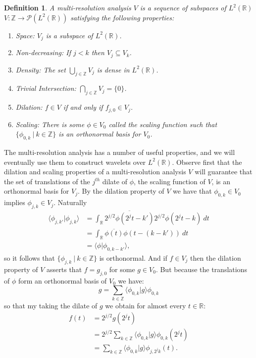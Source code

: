 \documentclass{report}
\newtheorem{def:multiresolutionanalysis}[thm:ellwave]{Definition}
\newcommand{\Z}{\mathbb{Z}}
\newcommand{\R}{\mathbb{R}}
\newcommand{\pow}{\mathcal{P}}
\begin{document}
\begin{def:multiresolutionanalysis}
A \emph{multi-resolution analysis} $V$ is a sequence of subspaces of $L^2 (\R)$ $V: \Z \to \pow (L^2 (\R ))$ satisfying the following properties:
\begin{enumerate}
\item \emph {Space:} $V_j$ is a subspace of $L^2(\R)$.
\item \emph{Non-decreasing:} If $j<k$ then $V_j \subseteq V_k$.
\item \emph{Density:} The set $\bigcup_{j \in \Z} V_j$ is dense in $L^2 (\R)$.
\item \emph{Trivial Intersection:} $\bigcap_{j \in \Z} V_j=\{0\}$.
\item \emph{Dilation:} $f \in V$ if and only if $f_{j,0} \in V_j$.
\item \emph{Scaling:} There is some $\phi \in V_0$ called the \emph{scaling function} such that $\{\phi_{0,k} \ | \ k \in \Z\}$ is an orthonormal basis for $V_0$.
\end{enumerate}
\end{def:multiresolutionanalysis}
The multi-resolution analysis has a number of useful properties, and we will eventually use them to construct wavelets over $L^2 (\R)$.  %
Observe first that the dilation and scaling properties of a multi-resolution analysis $V$ will guarantee that the set of translations of the $j^{th}$ dilate of $\phi$, the scaling function of $V$, is an orthonormal basis for $V_j$.
By the dilation property of $V$ we have that $\phi_{0,k} \in V_0$ implies $\phi_{j,k} \in V_j$. Naturally
\begin{align*}
\langle \phi_{j,k'} | \phi_{j,k} \rangle &= \int_\R \overline{2^{j/2}\phi(2^jt-k')} 2^{j/2}\phi(2^jt-k) \ dt\\
&= \int_\R \overline{\phi(t)}\phi(t-(k-k')) \ dt \\
&=\langle \phi | \phi_{0,k-k'} \rangle  ,
\end{align*}
so it follows that $\{ \phi_{j,k} \ | \ k\in \Z \}$ is orthonormal. And if $f \in V_j$ then the dilation property of $V$ asserts that $f=g_{j,0}$ for some $g \in V_0$. But because the translations of $\phi$ form an orthonormal basis of $V_0$ we have:
$$
g=\sum_{k \in \Z} \langle \phi_{0,k}| g \rangle \phi_{0,k}
$$
so that my taking the dilate of $g$ we obtain for almost every $t \in \R$:
\begin{align*}
f(t)&=2^{j/2}g(2^jt)\\
&=2^{j/2}\sum_{k \in \Z} \langle \phi_{0,k}| g \rangle \phi_{0,k}(2^jt)\\
&=\sum_{k \in \Z} \langle \phi_{0,k}| g \rangle \phi_{j,2^jk}(t).
\end{align*}
\end{document}
